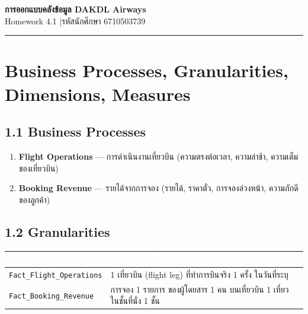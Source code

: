 \documentclass[11pt]{article}
\newcommand{\code}[1]{\texttt{#1}}
\newcommand{\secline}{\par\vspace{-2pt}\noindent\textcolor{tblHead}{\rule{\linewidth}{0.8pt}}\par\vspace{3pt}}
\begin{document}
\begin{center}
  {\LARGE\bfseries\color{factHead} การออกแบบคลังข้อมูล DAKDL Airways}\\[4pt]
  {\small Homework 4.1 \quad|\quad รหัสนักศึกษา 6710503739}
\end{center}
\secline

\section{Business Processes, Granularities, Dimensions, Measures}

\subsection*{1.1 Business Processes}
\begin{enumerate}[leftmargin=16pt,itemsep=1pt,topsep=2pt]
  \item \textbf{Flight Operations} — การดำเนินงานเที่ยวบิน (ความตรงต่อเวลา, ความล่าช้า, ความเต็มของเที่ยวบิน)
  \item \textbf{Booking Revenue} — รายได้จากการจอง (รายได้, ราคาตั๋ว, การจองล่วงหน้า, ความภักดีของลูกค้า)
\end{enumerate}

\subsection*{1.2 Granularities}
\begin{tabularx}{\linewidth}{@{}>{\small}p{4.3cm} Y@{}}
\toprule
{}
\textcolor{white}{\textbf{Fact Table}} & \textcolor{white}{\textbf{1 แถว แทนอะไร?}}\\
\midrule
\code{Fact_Flight_Operations} & 1 เที่ยวบิน (flight leg) ที่ทำการบินจริง 1 ครั้ง ในวันที่ระบุ\\

\code{Fact_Booking_Revenue} & การจอง 1 รายการ ของผู้โดยสาร 1 คน บนเที่ยวบิน 1 เที่ยว ในชั้นที่นั่ง 1 ชั้น\\
\bottomrule
\end{tabularx}

\clearpage
\end{document}
